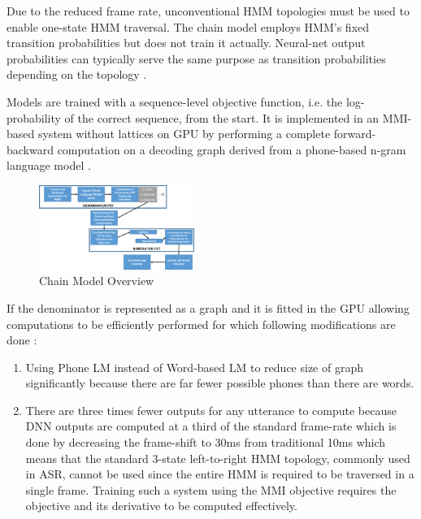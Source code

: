 Due to the reduced frame rate, unconventional HMM topologies must be used to enable one-state HMM traversal. The chain model employs HMM's fixed transition probabilities but does not train it actually. Neural-net output probabilities can typically serve the same purpose as transition probabilities depending on the topology \cite{daniel_povey_kaldi_nodate}.

Models are trained with a sequence-level objective function, i.e. the log-probability of the correct sequence, from the start. It is implemented in an MMI-based system without lattices on GPU by performing a complete forward-backward computation on a decoding graph derived from a phone-based n-gram language model \cite{povey_purely_2016}. 

\begin{figure}[h]
    \centering
    \includegraphics[width=0.45\textwidth]{img/ChainTrg.png}
    \caption{Chain Model Overview}
    \label{fig:chain-overview}
\end{figure}


If the denominator is represented as a graph and it is fitted in the GPU allowing computations to be efficiently performed for which following modifications are done \cite{noauthor_lattice_nodate, wiesner_lattice_2020}:

\begin{enumerate}
    \item Using Phone LM instead of Word-based LM to reduce size of graph significantly because there are far fewer possible phones than there are words.
    \item There are three times fewer outputs for any utterance to compute because DNN outputs are computed at a third of the standard frame-rate \cite{povey_purely_2016} which is done by decreasing the frame-shift to 30ms from traditional 10ms which means that the standard 3-state left-to-right HMM topology, commonly used in ASR, cannot be used since the entire HMM is required to be traversed in a single frame. Training such a system using the MMI objective requires the objective and its derivative to be computed effectively. 
    
\end{enumerate}

